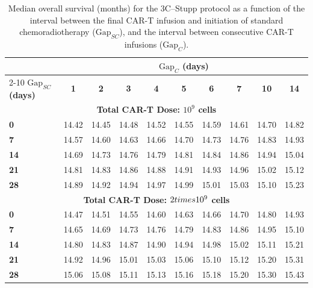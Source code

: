 \begin{table}[ht!]
    \caption{Median overall survival (months) for the 3C--Stupp protocol as a function of the interval between the final CAR-T infusion and initiation of standard chemoradiotherapy ($\mathrm{Gap}_{SC}$), and the interval between consecutive CAR-T infusions ($\mathrm{Gap}_{C}$).}
    \label{tab:3C-Stupp-gaps1}
    \centering
    \begin{ruledtabular}
        \begin{tabular}{lccccccccc}
            & \multicolumn{9}{c}{\textbf{$\mathrm{Gap}_{C}$ (days)}} \\
            \cline{2-10}
            \textbf{$\mathrm{Gap}_{SC}$ (days)} & \textbf{1} & \textbf{2} & \textbf{3} & \textbf{4} & \textbf{5} & \textbf{6} & \textbf{7} & \textbf{10} & \textbf{14} \\
            \hline
            \multicolumn{10}{c}{\textbf{Total CAR-T Dose: $10^9$ cells}} \\
            \hline
            \textbf{0}   & 14.42 & 14.45 & 14.48 & 14.52 & 14.55 & 14.59 & 14.61 & 14.70 & 14.82 \\
            \textbf{7}   & 14.57 & 14.60 & 14.63 & 14.66 & 14.70 & 14.73 & 14.76 & 14.83 & 14.93 \\
            \textbf{14}  & 14.69 & 14.73 & 14.76 & 14.79 & 14.81 & 14.84 & 14.86 & 14.94 & 15.04 \\
            \textbf{21}  & 14.81 & 14.83 & 14.86 & 14.88 & 14.91 & 14.93 & 14.96 & 15.02 & 15.12 \\
            \textbf{28}  & 14.89 & 14.92 & 14.94 & 14.97 & 14.99 & 15.01 & 15.03 & 15.10 & 15.23 \\
            \hline
            \multicolumn{10}{c}{\textbf{Total CAR-T Dose: $2\\times10^9$ cells}} \\
            \hline
            \textbf{0}   & 14.47 & 14.51 & 14.55 & 14.60 & 14.63 & 14.66 & 14.70 & 14.80 & 14.93 \\
            \textbf{7}   & 14.65 & 14.69 & 14.73 & 14.76 & 14.79 & 14.83 & 14.86 & 14.95 & 15.10 \\
            \textbf{14}  & 14.80 & 14.83 & 14.87 & 14.90 & 14.94 & 14.98 & 15.02 & 15.11 & 15.21 \\
            \textbf{21}  & 14.92 & 14.96 & 15.01 & 15.03 & 15.06 & 15.10 & 15.12 & 15.20 & 15.31 \\
            \textbf{28}  & 15.06 & 15.08 & 15.11 & 15.13 & 15.16 & 15.18 & 15.20 & 15.30 & 15.43 \\
        \end{tabular}
    \end{ruledtabular}
\end{table}

